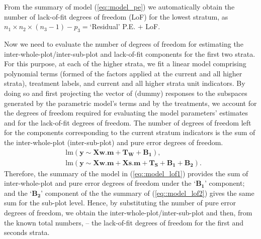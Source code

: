From the summary of model (\ref{eq::model_pe}) we automatically obtain the number of lack-of-fit degrees of freedom (LoF) for the lowest stratum, as $n_1\times n_2\times(n_3-1)-p_3 = $`Residual' P.E. $+$ LoF.

Now we need to evaluate the number of degrees of freedom for estimating the inter-whole-plot/inter-sub-plot and lack-of-fit components for the first two strata. For this purpose, at each of the higher strata, we fit a linear model comprising polynomial terms (formed of the factors applied at the current and all higher strata), treatment labels, and current and all higher strata unit indicators. By doing so and first projecting the vector of (dummy) responses to the subspaces generated by the parametric model's terms and by the treatments, we account for the degrees of freedom required for evaluating the model parameters' estimates and for the lack-of-fit degrees of freedom. The number of degrees of freedom left for the components corresponding to the current stratum indicators is the sum of the inter-whole-plot (inter-sub-plot) and pure error degrees of freedom. 
\begin{align}
\label{eq::model_lof1}
&\mathrm{lm}(\bm{y}\sim\bm{Xw.m}+\bm{T_{W}}+\bm{B_1}),\\
\label{eq::model_lof2}
&\mathrm{lm}(\bm{y}\sim\bm{Xw.m}+\bm{Xs.m}+\bm{T_{S}}+\bm{B_1}+\bm{B_2}).
\end{align}
Therefore, the summary of the model in (\ref{eq::model_lof1}) provides the sum of inter-whole-plot and pure error degrees of freedom under the `$\bm{B_1}$' component; and the `$\bm{B_2}$' component of the the summary of (\ref{eq::model_lof2}) gives the same sum for the sub-plot level. Hence, by substituting the number of pure error degrees of freedom, we obtain the inter-whole-plot/inter-sub-plot and then, from the known total numbers, -- the lack-of-fit degrees of freedom for the first and seconds strata.  

